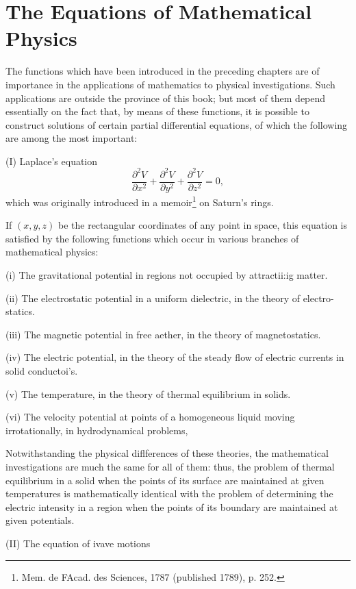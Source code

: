 %
%
\chapter{The Equations of Mathematical Physics}
The functions which have been introduced in the preceding chapters
are of importance in the applications of mathematics to physical
investigations. Such applications are outside the province of this
book; but most of them depend essentially on the fact that, by means
of these functions, it is possible to construct solutions of certain
partial differential equations, of which the following are among the
most important:

(I) Laplace's equation
$$
\frac{\partial^{2} V}{\partial x^{2}} +
\frac{\partial^{2} V}{\partial y^{2}} +
\frac{\partial^{2} V}{\partial z^{2}} =
0,
$$
which was originally introduced in a memoir\footnote{%
  Mem. de FAcad. des Sciences, 1787 (published 1789), p. 252.}
on Saturn's rings.

If $(x, y, z)$ be the rectangular coordinates of any point in
space, this equation is satisfied by the following functions
which occur in various branches of mathematical physics:

(i) The gravitational potential in regions not occupied by
attractii:ig matter.

(ii) The electrostatic potential in a uniform dielectric, in the
theory of electro- statics.

(iii) The magnetic potential in free aether, in the theory of
magnetostatics.

(iv) The electric potential, in the theory of the steady flow of
electric currents in solid conductoi's.

(v) The temperature, in the theory of thermal equilibrium in solids.

(vi) The velocity potential at points of a homogeneous liquid moving
irrotationally, in hydrodynamical problems,

Notwithstanding the physical diflferences of these theories, the
mathematical investigations are much the same for all of them:
thus, the problem of thermal equilibrium in a solid when the points
of its surface are maintained at given temperatures is
mathematically identical with the problem of determining the
electric intensity in a region when the points of its boundary
are maintained at given potentials.

(II) The equation of ivave motions

